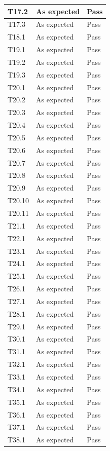 \documentclass[
]{article}
\begin{document}
\begin{longtable}{l|l|l}
T17.2 & As expected & Pass\\
\hline
T17.3 & As expected & Pass\\
\hline
T18.1 & As expected & Pass\\
\hline
T19.1 & As expected & Pass\\
\hline
T19.2 & As expected & Pass\\
\hline
T19.3 & As expected & Pass\\
\hline
T20.1 & As expected & Pass\\
\hline
T20.2 & As expected & Pass\\
\hline
T20.3 & As expected & Pass\\
\hline
T20.4 & As expected & Pass\\
\hline
T20.5 & As expected & Pass\\
\hline
T20.6 & As expected & Pass\\
\hline
T20.7 & As expected & Pass\\
\hline
T20.8 & As expected & Pass\\
\hline
T20.9 & As expected & Pass\\
\hline
T20.10 & As expected & Pass\\
\hline
T20.11 & As expected & Pass\\
\hline
T21.1 & As expected & Pass\\
\hline
T22.1 & As expected & Pass\\
\hline
T23.1 & As expected & Pass\\
\hline
T24.1 & As expected & Pass\\
\hline
T25.1 & As expected & Pass\\
\hline
T26.1 & As expected & Pass\\
\hline
T27.1 & As expected & Pass\\
\hline
T28.1 & As expected & Pass\\
\hline
T29.1 & As expected & Pass\\
\hline
T30.1 & As expected & Pass\\
\hline
T31.1 & As expected & Pass\\
\hline
T32.1 & As expected & Pass\\
\hline
T33.1 & As expected & Pass\\
\hline
T34.1 & As expected & Pass\\
\hline
T35.1 & As expected & Pass\\
\hline
T36.1 & As expected & Pass\\
\hline
T37.1 & As expected & Pass\\
\hline
T38.1 & As expected & Pass\\

\end{longtable}
\end{document}
